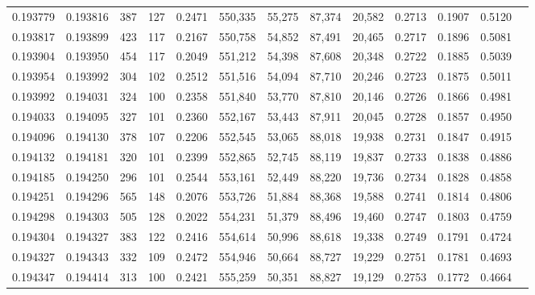 \begin{tabular}{rrrrrrrrrrrrr}
0.193779 & 0.193816 &   387 & 127 &                                     0.2471 & 550,335 &  55,275 &  87,374 &  20,582 & 0.2713 & 0.1907 & 0.5120 \\
0.193817 & 0.193899 &   423 & 117 &                                     0.2167 & 550,758 &  54,852 &  87,491 &  20,465 & 0.2717 & 0.1896 & 0.5081 \\
0.193904 & 0.193950 &   454 & 117 &                                     0.2049 & 551,212 &  54,398 &  87,608 &  20,348 & 0.2722 & 0.1885 & 0.5039 \\
0.193954 & 0.193992 &   304 & 102 &                                     0.2512 & 551,516 &  54,094 &  87,710 &  20,246 & 0.2723 & 0.1875 & 0.5011 \\
0.193992 & 0.194031 &   324 & 100 &                                     0.2358 & 551,840 &  53,770 &  87,810 &  20,146 & 0.2726 & 0.1866 & 0.4981 \\
0.194033 & 0.194095 &   327 & 101 &                                     0.2360 & 552,167 &  53,443 &  87,911 &  20,045 & 0.2728 & 0.1857 & 0.4950 \\
0.194096 & 0.194130 &   378 & 107 &                                     0.2206 & 552,545 &  53,065 &  88,018 &  19,938 & 0.2731 & 0.1847 & 0.4915 \\
0.194132 & 0.194181 &   320 & 101 &                                     0.2399 & 552,865 &  52,745 &  88,119 &  19,837 & 0.2733 & 0.1838 & 0.4886 \\
0.194185 & 0.194250 &   296 & 101 &                                     0.2544 & 553,161 &  52,449 &  88,220 &  19,736 & 0.2734 & 0.1828 & 0.4858 \\
0.194251 & 0.194296 &   565 & 148 &                                     0.2076 & 553,726 &  51,884 &  88,368 &  19,588 & 0.2741 & 0.1814 & 0.4806 \\
0.194298 & 0.194303 &   505 & 128 &                                     0.2022 & 554,231 &  51,379 &  88,496 &  19,460 & 0.2747 & 0.1803 & 0.4759 \\
0.194304 & 0.194327 &   383 & 122 &                                     0.2416 & 554,614 &  50,996 &  88,618 &  19,338 & 0.2749 & 0.1791 & 0.4724 \\
0.194327 & 0.194343 &   332 & 109 &                                     0.2472 & 554,946 &  50,664 &  88,727 &  19,229 & 0.2751 & 0.1781 & 0.4693 \\
0.194347 & 0.194414 &   313 & 100 &                                     0.2421 & 555,259 &  50,351 &  88,827 &  19,129 & 0.2753 & 0.1772 & 0.4664 \\

\end{tabular}

